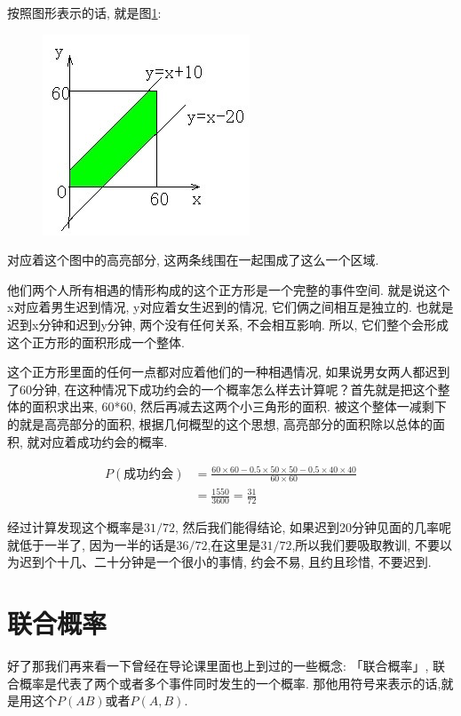 按照图形表示的话, 就是图\ref{fig:img21_2}: 

\begin{figure}[ht]
  \centering
  \includegraphics[width=0.4\linewidth]{asset/20230916204154.png}
  \caption{}
  \label{fig:img21_2}
\end{figure}

对应着这个图中的高亮部分, 这两条线围在一起围成了这么一个区域. 

他们两个人所有相遇的情形构成的这个正方形是一个完整的事件空间. 就是说这个x对应着男生迟到情况, y对应着女生迟到的情况, 它们俩之间相互是独立的. 也就是迟到x分钟和迟到y分钟, 两个没有任何关系, 不会相互影响. 所以, 它们整个会形成这个正方形的面积形成一个整体. 

这个正方形里面的任何一点都对应着他们的一种相遇情况, 如果说男女两人都迟到了60分钟, 在这种情况下成功约会的一个概率怎么样去计算呢？首先就是把这个整体的面积求出来, 60*60, 然后再减去这两个小三角形的面积. 被这个整体一减剩下的就是高亮部分的面积, 根据几何概型的这个思想, 高亮部分的面积除以总体的面积, 就对应着成功约会的概率. 

\begin{align*}
  P(\mbox{成功约会}) & = \frac{60 \times 60 - 0.5 \times 50 \times 50 - 0.5 \times 40 \times 40}{60 \times 60} \\
  & = \frac{1550}{3600}
  = \frac{31}{72}
\end{align*}

经过计算发现这个概率是$31/72$, 然后我们能得结论, 如果迟到20分钟见面的几率呢就低于一半了, 因为一半的话是$36/72$,在这里是$31/72$,所以我们要吸取教训, 不要以为迟到个十几、二十分钟是一个很小的事情, 约会不易, 且约且珍惜, 不要迟到. 

\section{联合概率}

好了那我们再来看一下曾经在导论课里面也上到过的一些概念: 「联合概率」, 联合概率是代表了两个或者多个事件同时发生的一个概率. 那他用符号来表示的话,就是用这个$P(AB)$或者$P(A,B)$. 


